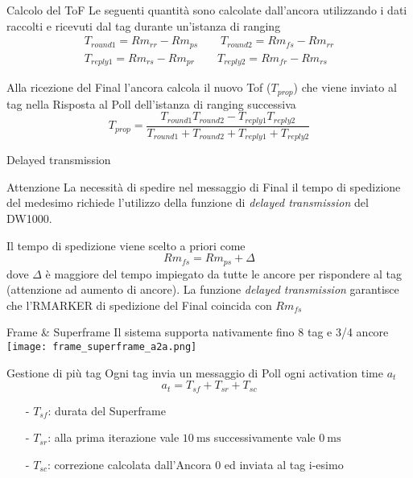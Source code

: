 \begin{frame}{Calcolo del ToF}
  Le seguenti quantità sono \alert{calcolate} dall'\alert{ancora} utilizzando i dati raccolti e
  ricevuti dal tag durante un'istanza di ranging
  \[
  \begin{split}
    T_{round1} = Rm_{rr} - Rm_{ps} \quad \quad T_{round2} = Rm_{fs} - Rm_{rr}\\
    T_{reply1} = Rm_{rs} - Rm_{pr} \quad \quad T_{reply2} = Rm_{fr} - Rm_{rs}
  \end{split}
  \]

  Alla ricezione del Final l'ancora calcola il nuovo Tof ($T_{prop}$) che viene inviato al tag nella Risposta al Poll dell'istanza di ranging \alert{successiva}
  \[
  T_{prop} = \frac{T_{round1} T_{round2} - T_{reply1} T_{reply2}}{T_{round1} + T_{round2} + T_{reply1} + T_{reply2}}
  \]
\end{frame}

\begin{frame}{Delayed transmission}
  \begin{alertblock}{Attenzione}
    La necessità di spedire nel messaggio di Final il tempo di spedizione del medesimo richiede
    l'utilizzo della funzione di \emph{delayed transmission} del DW1000.
  \end{alertblock}
  Il tempo di spedizione viene scelto a priori come
  \[
  Rm_{fs} = Rm_{ps} + \Delta
  \]
  dove $\Delta$ è maggiore del tempo impiegato da tutte le ancore per rispondere al tag (attenzione ad aumento di ancore).
  La funzione \emph{delayed transmission} garantisce che l'RMARKER di spedizione del Final coincida con
  $Rm_{fs}$
\end{frame}

\begin{frame}{Frame \& Superframe}
  Il sistema supporta \alert{nativamente} fino 8 tag e 3/4 ancore
  \centering
  \texttt{[image: frame\_superframe\_a2a.png]}
\end{frame}

\begin{frame}{Gestione di più tag}
  Ogni tag invia un messaggio di Poll ogni \alert{activation time} $a_t$
  \[
  a_t = T_{sf} + T_{sr} + T_{sc}
  \]
  \begin{itemize}
  \item[-] $T_{sf}$: durata del Superframe 
  \item[-] $T_{sr}$: alla prima iterazione vale $\SI{10}{\milli\second}$ successivamente vale  $\SI{0}{\milli\second}$
  \item[-] $T_{sc}$: correzione calcolata dall'\alert{Ancora 0} ed inviata al \alert{tag i-esimo} 
  \end{itemize}
\end{frame}

